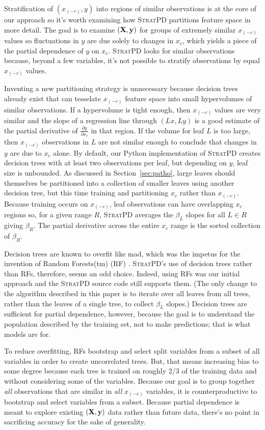 \documentclass[12pt]{article}
\newcommand{\secref}[1]{Section~\ref{#1}}
\newcommand{\spd}{\fontfamily{cmr}\textsc{\small StratPD}}
\newcommand{\xnc}{$x_{(-c)}$}
\begin{document}
Stratification of $(x_{(-c)}, y)$ into regions of similar observations is at the core of our approach so it's worth examining how \spd{} partitions feature space in more detail.  The goal is to examine $({\bf X}, {\bf y})$ for groups of extremely similar \xnc{} values so fluctuations in $y$ are due solely to changes in $x_c$, which yields a piece of the partial dependence of $y$ on $x_c$. \spd{} looks for similar observations because, beyond a few variables, it's not possible to stratify observations by equal \xnc{} values. 

Inventing a new partitioning strategy is unnecessary because decision trees already exist that can tesselate \xnc{} feature space into small hypervolumes of similar observations. If a hypervolume is tight enough, then \xnc{} values are very similar and the slope of a regression line through $(Lx, Ly)$ is a good estimate of the partial derivative of $\frac{\partial y}{\partial x_{c}}$ in that region.  If the volume for leaf $L$ is too large, then \xnc{} observations in $L$ are not similar enough to conclude that changes in $y$ are due to $x_c$ alone. By default, our Python implementation of \spd{} creates decision trees with at least two observations per leaf, but depending on $y$, leaf size is unbounded. As discussed in \secref{sec:patho}, large leaves should themselves be partitioned into a collection of smaller leaves using another decision tree, but this time training and partitioning $x_c$ rather than \xnc{}.  Because training occurs on \xnc{}, leaf observations can have overlapping $x_c$ regions so, for a given range $R$, \spd{} averages the $\beta_L$ slopes for all $L \in R$ giving $\beta_R$.  The partial derivative across the entire $x_c$ range is the sorted collection of $\beta_R$.

Decision trees are known to overfit like mad, which was the impetus for the invention of Random Forests(tm) (RF) \cite{RF}.  \spd's use of decision trees rather than RFs, therefore, seems an odd choice. Indeed, using RFs was our initial approach and the \spd{} source code still supports them. (The only change to the algorithm described in this paper is to iterate over all leaves from all trees, rather than the leaves of a single tree, to collect $\beta_L$ slopes.)  Decision trees are sufficient for partial dependence, however, because the goal is to understand the population described by the training set, not to make predictions; that is what models are for. 

To reduce overfitting, RFs bootstrap and select split variables from a subset of all variables in order to create uncorrelated trees. But, that means increasing bias to some degree because each tree is trained on roughly 2/3 of the training data and without considering some of the variables. Because our goal is to group together {\em all} observations that are similar in {\em all} \xnc{} variables, it is counterproductive to bootstrap and select variables from a subset. Because partial dependence is meant to explore existing $(\bf X, y)$ data rather than future data, there's no point in sacrificing accuracy for the sake of generality. 
\end{document}
